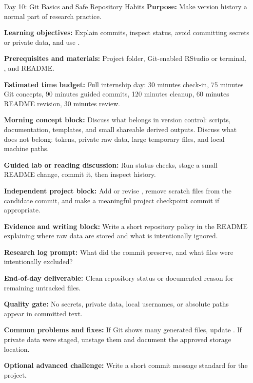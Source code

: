 \begin{dailybox}{Day 10: Git Basics and Safe Repository Habits}
\textbf{Purpose:} Make version history a normal part of research practice.

\textbf{Learning objectives:} Explain commits, inspect status, avoid committing secrets or private data, and use .

\textbf{Prerequisites and materials:} Project folder, Git-enabled RStudio or terminal, , and README.

\textbf{Estimated time budget:} Full internship day: 30 minutes check-in, 75 minutes Git concepts, 90 minutes guided commits, 120 minutes cleanup, 60 minutes README revision, 30 minutes review.

\textbf{Morning concept block:} Discuss what belongs in version control: scripts, documentation, templates, and small shareable derived outputs. Discuss what does not belong: tokens, private raw data, large temporary files, and local machine paths.

\textbf{Guided lab or reading discussion:} Run status checks, stage a small README change, commit it, then inspect history.

\textbf{Independent project block:} Add or revise , remove scratch files from the candidate commit, and make a meaningful project checkpoint commit if appropriate.

\textbf{Evidence and writing block:} Write a short repository policy in the README explaining where raw data are stored and what is intentionally ignored.

\textbf{Research log prompt:} What did the commit preserve, and what files were intentionally excluded?

\textbf{End-of-day deliverable:} Clean repository status or documented reason for remaining untracked files.

\textbf{Quality gate:} No secrets, private data, local usernames, or absolute paths appear in committed text.

\textbf{Common problems and fixes:} If Git shows many generated files, update . If private data were staged, unstage them and document the approved storage location.

\textbf{Optional advanced challenge:} Write a short commit message standard for the project.
\end{dailybox}

